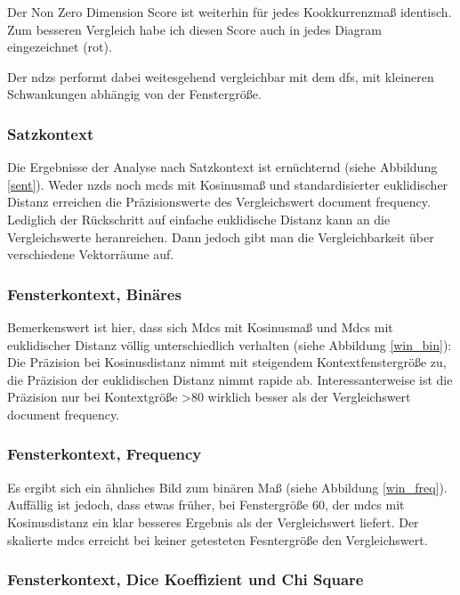 \documentclass[11pt,numbers=noenddot]{scrartcl}
\begin{document}
Der Non Zero Dimension Score ist weiterhin für jedes Kookkurrenzmaß identisch. Zum besseren Vergleich habe ich diesen Score auch in jedes Diagram eingezeichnet (rot).

Der ndzs performt dabei weitesgehend vergleichbar mit dem dfs, mit kleineren Schwankungen abhängig von der Fenstergröße.

\subsubsection {Satzkontext}

Die Ergebnisse der Analyse nach Satzkontext ist ernüchternd (siehe Abbildung \ref{sent}). Weder nzds noch mcds mit Kosinusmaß und standardisierter euklidischer Distanz erreichen die Präzisionswerte des Vergleichswert document frequency. Lediglich der Rückschritt auf einfache euklidische Distanz kann an die Vergleichswerte heranreichen. Dann jedoch gibt man die Vergleichbarkeit über verschiedene Vektorräume auf.


\subsubsection{Fensterkontext, Binäres}

Bemerkenswert ist hier, dass sich Mdcs mit Kosinusmaß und Mdcs mit euklidischer Distanz völlig unterschiedlich verhalten (siehe Abbildung \ref{win_bin}): Die Präzision bei Kosinusdistanz nimmt mit steigendem Kontextfenstergröße zu, die Präzision der euklidischen Distanz nimmt rapide ab. Interessanterweise ist die Präzision nur bei Kontextgröße >80 wirklich besser als der Vergleichswert document frequency.


\subsubsection{Fensterkontext, Frequency}

Es ergibt sich ein ähnliches Bild zum binären Maß (siehe Abbildung \ref{win_freq}). Auffällig ist jedoch, dass etwas früher, bei Fenstergröße 60, der mdcs mit Kosinusdistanz ein klar besseres Ergebnis als der Vergleichswert liefert. Der skalierte mdcs erreicht bei keiner getesteten Fesntergröße den Vergleichswert.


\subsubsection{Fensterkontext, Dice Koeffizient und Chi Square}
\end{document}
